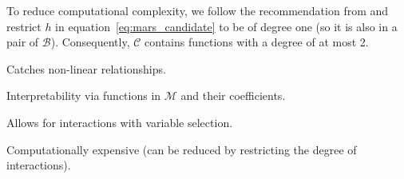 {    To reduce computational complexity, we follow the recommendation from \cite{stephenEarthMultivariateAdaptive2021} and restrict $h$ in equation~\eqref{eq:mars_candidate} to be of degree one (so it is also in a pair of $\mathcal{B}$). Consequently, $\mathcal{C}$ contains functions with a degree of at most 2. 

    \begin{my_pros_cons_table}{
        \item Catches non-linear relationships.
        \item Interpretability via functions in $\mathcal{M}$ and their coefficients.
        \item Allows for interactions with variable selection.
    }{
        \item Computationally expensive (can be reduced by restricting the degree of interactions).
    }
    \end{my_pros_cons_table}
}
